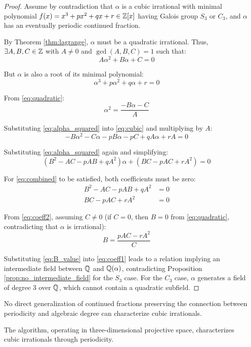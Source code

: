 \begin{proof}
Assume by contradiction that $\alpha$ is a cubic irrational with minimal polynomial $f(x) = x^3 + px^2 + qx + r \in \mathbb{Z}[x]$ having Galois group $S_3$ or $C_3$, and $\alpha$ has an eventually periodic continued fraction.

By Theorem \ref{thm:lagrange}, $\alpha$ must be a quadratic irrational. Thus, $\exists A, B, C \in \mathbb{Z}$ with $A \neq 0$ and $\gcd(A, B, C) = 1$ such that:
\begin{equation}\label{eq:quadratic}
A\alpha^2 + B\alpha + C = 0
\end{equation}

But $\alpha$ is also a root of its minimal polynomial:
\begin{equation}\label{eq:cubic}
\alpha^3 + p\alpha^2 + q\alpha + r = 0
\end{equation}

From \eqref{eq:quadratic}:
\begin{equation}\label{eq:alpha_squared}
\alpha^2 = \frac{-B\alpha - C}{A}
\end{equation}

Substituting \eqref{eq:alpha_squared} into \eqref{eq:cubic} and multiplying by $A$:
\begin{equation}
-B\alpha^2 - C\alpha - pB\alpha - pC + qA\alpha + rA = 0
\end{equation}

Substituting \eqref{eq:alpha_squared} again and simplifying:
\begin{equation}\label{eq:combined}
(B^2 - AC - pAB + qA^2)\alpha + (BC - pAC + rA^2) = 0
\end{equation}

For \eqref{eq:combined} to be satisfied, both coefficients must be zero:
\begin{align}
B^2 - AC - pAB + qA^2 &= 0 \label{eq:coeff1}\\
BC - pAC + rA^2 &= 0 \label{eq:coeff2}
\end{align}

From \eqref{eq:coeff2}, assuming $C \neq 0$ (if $C = 0$, then $B = 0$ from \eqref{eq:quadratic}, contradicting that $\alpha$ is irrational):
\begin{equation}\label{eq:B_value}
B = \frac{pAC - rA^2}{C}
\end{equation}

Substituting \eqref{eq:B_value} into \eqref{eq:coeff1} leads to a relation implying an intermediate field between $\mathbb{Q}$ and $\mathbb{Q}(\alpha)$, contradicting Proposition \ref{prop:no_intermediate_field} for the $S_3$ case. For the $C_3$ case, $\alpha$ generates a field of degree 3 over $\mathbb{Q}$, which cannot contain a quadratic subfield.
\end{proof}

\begin{corollary}\label{cor:cf_insufficient}
No direct generalization of continued fractions preserving the connection between periodicity and algebraic degree can characterize cubic irrationals.
\end{corollary}

The \HAPD{} algorithm, operating in three-dimensional projective space, characterizes cubic irrationals through periodicity.
